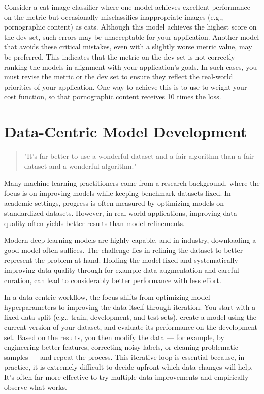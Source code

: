 \documentclass[12pt,openany, draft]{book}
\begin{document}
\begin{examplebox}
Consider a cat image classifier where one model achieves excellent performance on the metric but occasionally misclassifies inappropriate images (e.g., pornographic content) as cats. Although this model achieves the highest score on the dev set, such errors may be unacceptable for your application. Another model that avoids these critical mistakes, even with a slightly worse metric value, may be preferred. This indicates that the metric on the dev set is not correctly ranking the models in alignment with your application’s goals. In such cases, you must revise the metric or the dev set to ensure they reflect the real-world priorities of your application. One way to achieve this is to use to weight your cost function, so that pornographic content receives 10 times the loss. 
\end{examplebox}




\chapter{Data-Centric Model Development}

\begin{quote}
    "It's far better to use a wonderful dataset and a fair algorithm than a fair dataset and a wonderful algorithm."
\end{quote}

Many machine learning practitioners come from a research background, where the focus is on improving models while keeping benchmark datasets fixed. In academic settings, progress is often measured by optimizing models on standardized datasets. However, in real-world applications, improving data quality often yields better results than model refinements.
\newline

Modern deep learning models are highly capable, and in industry, downloading a good model often suffices. The challenge lies in refining the dataset to better represent the problem at hand. Holding the model fixed and systematically improving data quality through for example data augmentation and careful curation, can lead to considerably better performance with less effort.
\newline

In a data-centric workflow, the focus shifts from optimizing model hyperparameters to improving the data itself through iteration. You start with a fixed data split (e.g., train, development, and test sets), create a model using the current version of your dataset, and evaluate its performance on the development set. Based on the results, you then modify the data — for example, by engineering better features, correcting noisy labels, or cleaning problematic samples — and repeat the process.
This iterative loop is essential because, in practice, it is extremely difficult to decide upfront which data changes will help. It's often far more effective to try multiple data improvements and empirically observe what works.
\newline
\end{document}
